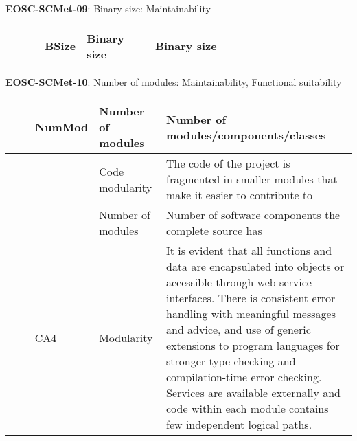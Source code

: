 \textbf{EOSC-SCMet-09}: Binary size: Maintainability
\nopagebreak[4]
\begin{center}
    \tabletail{\hline}
    \tiny
    \begin{supertabular}{|p{0.10\linewidth}|p{0.10\linewidth}|p{0.20\linewidth}|p{0.60\linewidth}|} \hline
        \cite{montagud_systematic_2012} & BSize & Binary size & Binary size\\ \hline
    \end{supertabular}
\end{center}

\textbf{EOSC-SCMet-10}: Number of modules: Maintainability, Functional suitability
\nopagebreak[4]
\begin{center}
    \tabletail{\hline}
    \tiny
    \begin{supertabular}{|p{0.10\linewidth}|p{0.10\linewidth}|p{0.20\linewidth}|p{0.60\linewidth}|} \hline
        \cite{montagud_systematic_2012} & NumMod & Number of modules & Number of modules/components/classes\\ \hline
        \cite{aberdour_achieving_2007} & - & Code modularity & The code of the project is fragmented in smaller modules that make it easier to contribute to\\ \hline
        \cite{tanaka_software_1998} & - & Number of modules & Number of software components the complete source has\\ \hline
        \cite{shepherdson_cessda_2019} & CA4 & Modularity & It is evident that all functions and data are encapsulated into objects or accessible through web service interfaces. There is consistent error handling with meaningful messages and advice, and use of generic extensions to program languages for stronger type checking and compilation-time error checking. Services are available externally and code within each module contains few independent logical paths.\\ \hline
    \end{supertabular}
\end{center}

